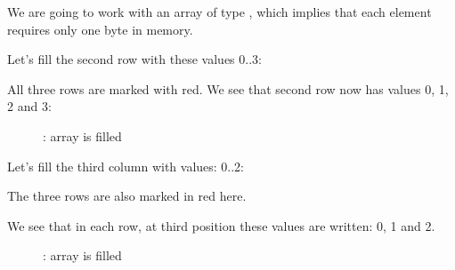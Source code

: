 
We are going to work with an array of type \Tchar, which implies that each element requires only one 
byte in memory.

\myindex{\olly}

Let's fill the second row with these values 0..3:



All three rows are marked with red. 
We see that second row now has values 0, 1, 2 and 3:

\begin{figure}[H]
\centering
{}
\caption{\olly: array is filled}
\end{figure}

\myindex{\olly}

Let's fill the third column with values: 0..2:



The three rows are also marked in red here. 

We see that in each row, at third position these values are written: 0, 1 and 2.

\begin{figure}[H]
\centering
{}
\caption{\olly: array is filled}
\end{figure}

